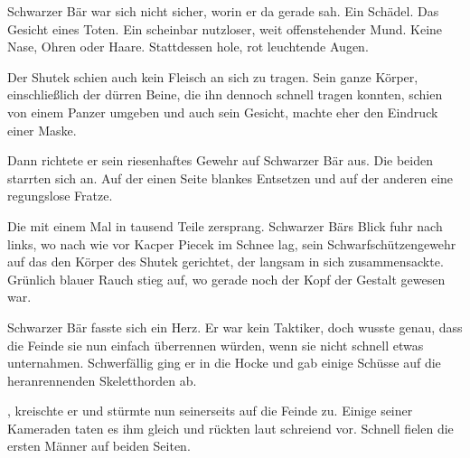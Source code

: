 \par

Schwarzer Bär war sich nicht sicher, worin er da gerade sah. Ein Schädel. Das Gesicht eines Toten. Ein scheinbar nutzloser, weit offenstehender Mund. Keine Nase, Ohren oder Haare. Stattdessen hole, rot leuchtende Augen.

\par

Der Shutek schien auch kein Fleisch an sich zu tragen. Sein ganze Körper, einschließlich der dürren Beine, die ihn dennoch schnell tragen konnten, schien von einem Panzer umgeben und auch sein Gesicht, machte eher den Eindruck einer Maske.

\par

Dann richtete er sein riesenhaftes Gewehr auf Schwarzer Bär aus. Die beiden starrten sich an. Auf der einen Seite blankes Entsetzen und auf der anderen eine regungslose Fratze.

\par

Die mit einem Mal in tausend Teile zersprang. Schwarzer Bärs Blick fuhr nach links, wo nach wie vor Kacper Piecek im Schnee lag, sein Schwarfschützengewehr auf das den Körper des Shutek gerichtet, der langsam in sich zusammensackte. Grünlich blauer Rauch stieg auf, wo gerade noch der Kopf der Gestalt gewesen war.

\par

Schwarzer Bär fasste sich ein Herz. Er war kein Taktiker, doch wusste genau, dass die Feinde sie nun einfach überrennen würden, wenn sie nicht schnell etwas unternahmen. Schwerfällig ging er in die Hocke und gab einige Schüsse auf die heranrennenden Skeletthorden ab.

\par

, kreischte er und stürmte nun seinerseits auf die Feinde zu. Einige seiner Kameraden taten es ihm gleich und rückten laut schreiend vor. Schnell fielen die ersten Männer auf beiden Seiten.
